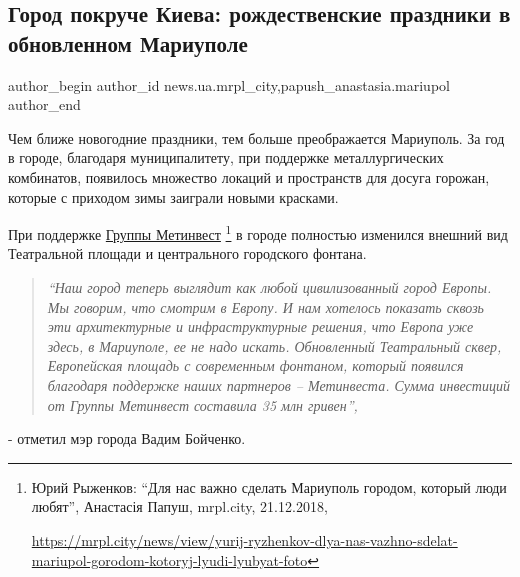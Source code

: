  
 
 
 
 
 
\subsection{Город покруче Киева: рождественские праздники в обновленном Мариуполе}
\label{sec:21_12_2018.stz.news.ua.mrpl_city.2.gorod_pokruche_kieva}
 
\ifcmt
 author_begin
   author_id news.ua.mrpl_city,papush_anastasia.mariupol
 author_end
\fi

Чем ближе новогодние праздники, тем больше преображается Мариуполь. За год в
городе, благодаря муниципалитету, при поддержке металлургических комбинатов,
появилось множество локаций и пространств для досуга горожан, которые с
приходом зимы заиграли новыми красками.

При поддержке \href{https://mrpl.city/news/view/yurij-ryzhenkov-dlya-nas-vazhno-sdelat-mariupol-gorodom-kotoryj-lyudi-lyubyat-foto}{%
Группы Метинвест}%
\footnote{Юрий Рыженков: \enquote{Для нас важно сделать Мариуполь городом, который люди любят}, Анастасія Папуш, mrpl.city, 21.12.2018, \par
\url{https://mrpl.city/news/view/yurij-ryzhenkov-dlya-nas-vazhno-sdelat-mariupol-gorodom-kotoryj-lyudi-lyubyat-foto}
}
в городе полностью изменился внешний вид
Театральной площади и центрального городского фонтана.

\begin{quote}
\em\enquote{Наш город теперь выглядит как любой цивилизованный город Европы. Мы говорим,
что смотрим в Европу. И нам хотелось показать сквозь эти архитектурные и
инфраструктурные решения, что Европа уже здесь, в Мариуполе, ее не надо искать.
Обновленный Театральный сквер, Европейская площадь с современным фонтаном,
который появился благодаря поддержке наших партнеров – Метинвеста. Сумма
инвестиций от Группы Метинвест составила 35 млн гривен}, 
\end{quote}
- отметил мэр города Вадим Бойченко.

